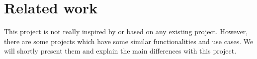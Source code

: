 \chapter{Related work}
This project is not really inspired by or based on any existing project. However, there 
are some projects which have some similar functionalities and use cases. We will 
shortly present them and explain the main differences with this project.
%

%

%